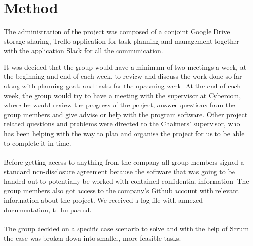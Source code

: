 \section{Method}



\paragraph{}
The administration of the project was composed of a conjoint Google Drive storage sharing, Trello application for task planning and management together with the application Slack for all the communication.

It was decided that the group would have a minimum of two meetings a week, at the beginning and end of each week, to review and discuss the work done so far along with planning goals and tasks for the upcoming week. At the end of each week, the group would try to have a meeting with the supervisor at Cybercom, where he would review the progress of the project, answer questions from the group members and give advise or help with the program software. Other project related questions and problems were directed to the Chalmers' supervisor, who has been helping with the way to plan and organise the project for us to be able to complete it in time.

\paragraph{}
Before getting access to anything from the company all group members signed a standard non-disclosure agreement because the software that was going to be handed out to potentially be worked with contained confidential information. The group members also got access to the company's Github account with relevant information about the project. We received a log file with annexed documentation, to be parsed. 

\paragraph{}
The group decided on a specific case scenario to solve and with the help of Scrum the case was broken down into smaller, more feasible tasks. 

